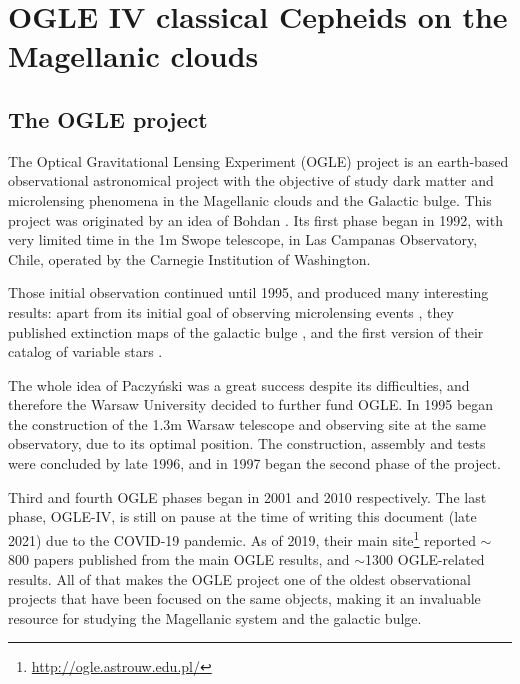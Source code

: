 \section{OGLE IV classical Cepheids on the Magellanic clouds}

\subsection{The OGLE project}

The Optical Gravitational Lensing Experiment (OGLE) project is an earth-based observational astronomical project 
with the objective of study dark matter and microlensing phenomena in the Magellanic clouds and the Galactic bulge.
This project was originated by an idea of Bohdan \cite{Paczynski1986}. 
Its first phase began in 1992, with very limited time in the 1m Swope telescope, in Las Campanas Observatory, Chile,
operated by the Carnegie Institution of Washington.

Those initial observation continued until 1995, and produced many interesting results: 
apart from its initial goal of observing microlensing events \citep{Udalski1993},
they published extinction maps of the galactic bulge \citep{Stanek1996},
and the first version of their catalog of variable stars \citep{Udalski1997}.

The whole idea of Paczyński was a great success despite its difficulties,
and therefore the Warsaw University decided to further fund OGLE.
In 1995 began the construction of the 1.3m Warsaw telescope and observing site at the same observatory, due to its optimal position.
The construction, assembly and tests were concluded by late 1996, 
and in 1997 began the second phase of the project.

Third and fourth OGLE phases began in 2001 and 2010 respectively. 
The last phase, OGLE-IV, is still on pause at the time of writing this document (late 2021) due to the COVID-19 pandemic.
As of 2019, their main site\footnote{\url{http://ogle.astrouw.edu.pl/}} reported $\sim$800 papers published from the main OGLE results,
and $\sim$1300 OGLE-related results. 
All of that makes the OGLE project one of the oldest observational projects that have been focused on the same objects,
making it an invaluable resource for studying the Magellanic system and the galactic bulge.

